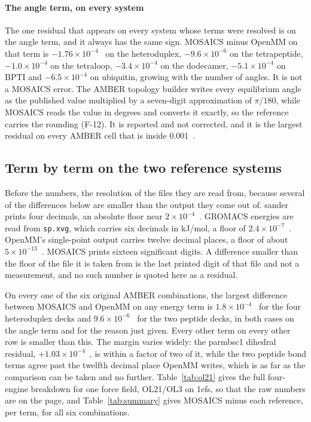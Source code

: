 \paragraph{The angle term, on every system}
The one residual that appears on every system whose terms were resolved is on
the angle term, and it always has the same sign. MOSAICS minus OpenMM on that
term is $-1.76\times10^{-4}$~\kcal{} on the heteroduplex, $-9.6\times10^{-6}$
on the tetrapeptide, $-1.0\times10^{-4}$ on the tetraloop, $-3.4\times10^{-4}$
on the dodecamer, $-5.1\times10^{-4}$ on BPTI and $-6.5\times10^{-4}$ on
ubiquitin, growing with the number of angles. It is not a MOSAICS error. The
AMBER topology builder writes every equilibrium angle as the published value
multiplied by a seven-digit approximation of $\pi/180$, while MOSAICS reads the
value in degrees and converts it exactly, so the reference carries the rounding
(F-12). It is reported and not corrected, and it is the largest residual on
every AMBER cell that is inside 0.001~\kcal{}.

\subsection{Term by term on the two reference systems}
\label{sec:energies}

Before the numbers, the resolution of the files they are read from, because
several of the differences below are smaller than the output they come out of.
sander prints four decimals, an absolute floor near $2\times10^{-4}$~\kcal{}.
GROMACS energies are read from \texttt{sp.xvg}, which carries six decimals in
kJ/mol, a floor of $2.4\times10^{-7}$~\kcal{}. OpenMM's single-point output
carries twelve decimal places, a floor of about $5\times10^{-13}$~\kcal{}.
MOSAICS prints sixteen significant digits. A difference smaller than the floor
of the file it is taken from is the last printed digit of that file and not a
measurement, and no such number is quoted here as a residual.

On every one of the six original AMBER combinations, the largest difference
between MOSAICS and OpenMM on any energy term is $1.8\times10^{-4}$~\kcal{} for
the four heteroduplex decks and $9.6\times10^{-6}$~\kcal{} for the two peptide
decks, in both cases on the angle term and for the reason just given. Every
other term on every other row is smaller than this. The margin varies widely:
the parmbsc1 dihedral residual, $+1.03\times10^{-4}$~\kcal{}, is within a factor
of two of it, while the two peptide bond terms agree past the twelfth decimal
place OpenMM writes, which is as far as the comparison can be taken and no
further. Table~\ref{tab:ol21} gives the full four-engine breakdown for one force
field, OL21/OL3 on 1efs, so that the raw numbers are on the page, and
Table~\ref{tab:summary} gives MOSAICS minus each reference, per term, for all
six combinations.

